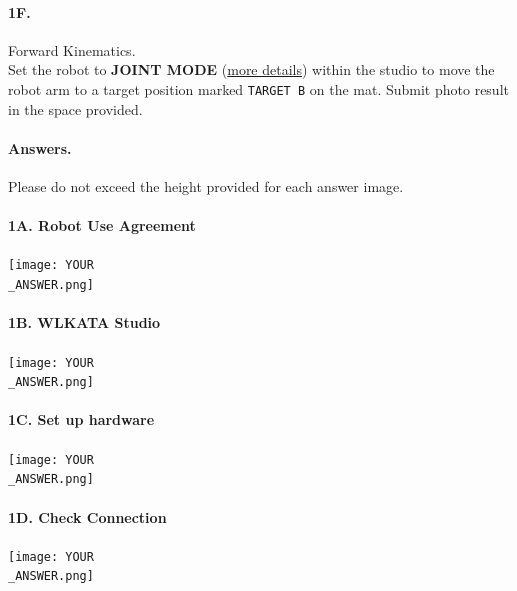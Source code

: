 \paragraph{1F.} Forward Kinematics.\\
\noindent Set the robot to \textbf{JOINT MODE} (\href{https://document.wlkata.com/?doc=/wlkata-mirobot-user-manual/12-quick-start-guide-of-mirobot/\#header-three-2mfvd}{more details}) within the studio to move the robot arm to a target position marked \texttt{TARGET B} on the mat. Submit photo result in the space provided.

\newpage

\paragraph{Answers.}
Please do not exceed the height provided for each answer image.


\paragraph{1A. Robot Use Agreement}
\begin{center}
    \texttt{[image: YOUR\\\_ANSWER.png]}
\end{center}

\paragraph{1B. WLKATA Studio}
\begin{center}
    \texttt{[image: YOUR\\\_ANSWER.png]}
\end{center}

\newpage
\paragraph{1C. Set up hardware}
\begin{center}
    \texttt{[image: YOUR\\\_ANSWER.png]}
\end{center}

\paragraph{1D. Check Connection}
\begin{center}
    \texttt{[image: YOUR\\\_ANSWER.png]}
\end{center}

